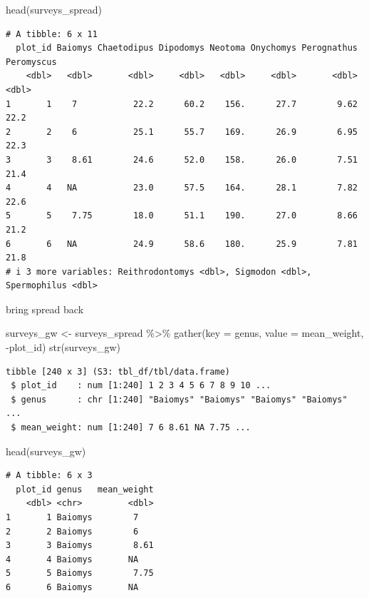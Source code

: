 \documentclass[
  letterpaper,
  DIV=11,
  numbers=noendperiod]{scrreprt}
\newenvironment{Shaded}{\begin{snugshade}}{\end{snugshade}}
\newcommand{\AttributeTok}[1]{\textcolor[rgb]{0.40,0.45,0.13}{#1}}
\newcommand{\FunctionTok}[1]{\textcolor[rgb]{0.28,0.35,0.67}{#1}}
\newcommand{\NormalTok}[1]{\textcolor[rgb]{0.00,0.23,0.31}{#1}}
\newcommand{\OtherTok}[1]{\textcolor[rgb]{0.00,0.23,0.31}{#1}}
\newcommand{\SpecialCharTok}[1]{\textcolor[rgb]{0.37,0.37,0.37}{#1}}
\begin{document}
\begin{Shaded}
\begin{Highlighting}[]
\FunctionTok{head}\NormalTok{(surveys\_spread)}
\end{Highlighting}
\end{Shaded}

\begin{verbatim}
# A tibble: 6 x 11
  plot_id Baiomys Chaetodipus Dipodomys Neotoma Onychomys Perognathus Peromyscus
    <dbl>   <dbl>       <dbl>     <dbl>   <dbl>     <dbl>       <dbl>      <dbl>
1       1    7           22.2      60.2    156.      27.7        9.62       22.2
2       2    6           25.1      55.7    169.      26.9        6.95       22.3
3       3    8.61        24.6      52.0    158.      26.0        7.51       21.4
4       4   NA           23.0      57.5    164.      28.1        7.82       22.6
5       5    7.75        18.0      51.1    190.      27.0        8.66       21.2
6       6   NA           24.9      58.6    180.      25.9        7.81       21.8
# i 3 more variables: Reithrodontomys <dbl>, Sigmodon <dbl>, Spermophilus <dbl>
\end{verbatim}

bring spread back

\begin{Shaded}
\begin{Highlighting}[]
\NormalTok{surveys\_gw }\OtherTok{\textless{}{-}}\NormalTok{ surveys\_spread }\SpecialCharTok{\%\textgreater{}\%}
  \FunctionTok{gather}\NormalTok{(}\AttributeTok{key =}\NormalTok{ genus, }\AttributeTok{value =}\NormalTok{ mean\_weight, }\SpecialCharTok{{-}}\NormalTok{plot\_id)}
\FunctionTok{str}\NormalTok{(surveys\_gw)}
\end{Highlighting}
\end{Shaded}

\begin{verbatim}
tibble [240 x 3] (S3: tbl_df/tbl/data.frame)
 $ plot_id    : num [1:240] 1 2 3 4 5 6 7 8 9 10 ...
 $ genus      : chr [1:240] "Baiomys" "Baiomys" "Baiomys" "Baiomys" ...
 $ mean_weight: num [1:240] 7 6 8.61 NA 7.75 ...
\end{verbatim}

\begin{Shaded}
\begin{Highlighting}[]
\FunctionTok{head}\NormalTok{(surveys\_gw)}
\end{Highlighting}
\end{Shaded}

\begin{verbatim}
# A tibble: 6 x 3
  plot_id genus   mean_weight
    <dbl> <chr>         <dbl>
1       1 Baiomys        7   
2       2 Baiomys        6   
3       3 Baiomys        8.61
4       4 Baiomys       NA   
5       5 Baiomys        7.75
6       6 Baiomys       NA   
\end{verbatim}
\end{document}
